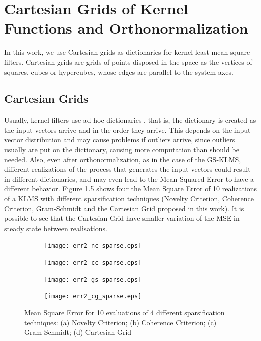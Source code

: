 \chapter{Cartesian Grids of Kernel Functions and Orthonormalization}\label{sec:grids}

In this work, we use Cartesian grids as dictionaries for kernel least-mean-square filters. Cartesian grids are grids of points disposed in the space as the vertices of squares, cubes or hypercubes, whose edges are parallel to the system axes. 

\section{Cartesian Grids}

Usually, kernel filters use ad-hoc dictionaries \cite{engel_kernel_2004,richard_online_2009,platt_resource-allocating_1991,badong_chen_quantized_2012,bueno_gram-schmidt-based_2020}, that is, the dictionary is created as the input vectors arrive and in the order they arrive. This depends on the input vector distribution and may cause problems if outliers arrive, since outliers usually are put on the dictionary, causing more computation than should be needed. Also, even after orthonormalization, as in the case of the GS-KLMS, different realizations of the process that generates the input vectors could result in different dictionaries, and may even lead to the Mean Squared Error to have a different behavior. 
Figure \ref{fig:err2_sparsifications} shows four the Mean Square Error of 10 realizations of a KLMS with different sparsification techniques (Novelty Criterion, Coherence Criterion, Gram-Schmidt and the Cartesian Grid proposed in this work). It is possible to see that the Cartesian Grid have smaller variation of the MSE in steady state between realisations.
\begin{figure}
    \centering
    \begin{subfigure}[b]{0.45\linewidth}
        \texttt{[image: err2\_nc\_sparse.eps]}
        \caption{}
        \label{fig:err2_nc}
    \end{subfigure}
    \begin{subfigure}[b]{0.45\linewidth}
        \texttt{[image: err2\_cc\_sparse.eps]}
        \caption{}
        \label{fig:err2_cc}
    \end{subfigure}
    \begin{subfigure}[b]{0.45\linewidth}
        \texttt{[image: err2\_gs\_sparse.eps]}
        \caption{}
        \label{fig:err2_gs}
    \end{subfigure}
    \begin{subfigure}[b]{0.45\linewidth}
        \texttt{[image: err2\_cg\_sparse.eps]}
        \caption{}
        \label{fig:err2_cg}
    \end{subfigure}
    \caption{Mean Square Error for 10 evaluations of 4 different sparsification techniques: (a) Novelty Criterion; (b) Coherence Criterion; (c) Gram-Schmidt; (d) Cartesian Grid}
    \label{fig:err2_sparsifications}
\end{figure}

